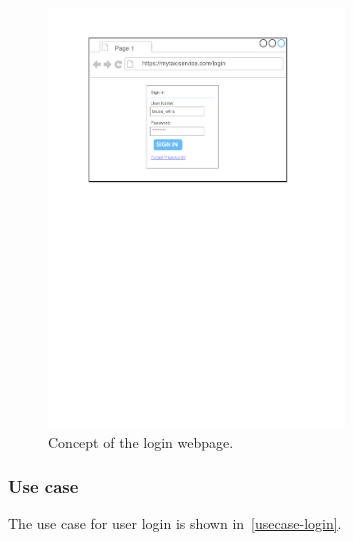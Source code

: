 \begin{figure}
\begin{center}
\includegraphics[width=0.7\textwidth]{mockup/Login_browser.pdf}
\caption{Concept of the login webpage.}
\label{fig:mockup-login}
\end{center}
\end{figure}

\subsubsection{Use case}
The use case for user login is shown in~\autoref{usecase-login}.

